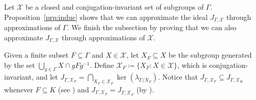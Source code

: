 \documentclass[11pt, oneside, reqno]{amsart}
\theoremstyle{definition}
\theoremstyle{remark}
\numberwithin{equation}{section}
\begin{document}
Let $\mathcal{X}$ be a closed and conjugation-invariant set of subgroups of $\Gamma$. Proposition~\ref{prp:induc} shows that we can approximate the ideal $J_{\Gamma,\mathcal{X}}$ through approximations of $\Gamma$. We finish the subsection by proving that we can also approximate $J_{\Gamma,\mathcal{X}}$ through approximations of $\mathcal{X}$.

Given a finite subset $F\subseteq\Gamma$ and $X\in\mathcal{X}$, let $X_{F} \subseteq X$ be the subgroup generated by the set $\bigcup_{g\in \Gamma}X\cap gFg^{-1}$. Define $\mathcal{X}_{F} \coloneq \{X_{F} \colon X\in\mathcal{X}\}$, which is conjugation-invariant, and let $J_{\Gamma,\mathcal{X}_{F}} = \bigcap_{X_{F}\in\mathcal{X}_{F}}\ker(\lambda_{\Gamma/X_{F}})$. Notice that $J_{\Gamma, \mathcal{X}_{F}}\subseteq J_{\Gamma, \mathcal{X}_{K}}$ whenever $F\subseteq K$ (see \cite[Appendix~E~and~F]{BHV07}) and $J_{\Gamma,\mathcal{X}_{F}} = J_{\Gamma, \overline{\mathcal{X}_{F}}}$ (by \cite[Proposition~3.3]{BK20}).
\end{document}
